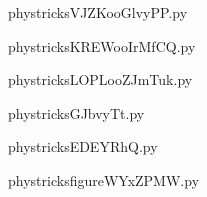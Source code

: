     \newcommand{\CaptionFigVJZKooGlvyPP}{<+Type your caption here+>}
    \begin{center}
        
    \end{center}
    phystricksVJZKooGlvyPP.py

    

    \clearpage
    


    \newcommand{\CaptionFigKREWooIrMfCQ}{<+Type your caption here+>}
    \begin{center}
        
    \end{center}
    phystricksKREWooIrMfCQ.py

    

    \clearpage
    


    \newcommand{\CaptionFigLOPLooZJmTuk}{<+Type your caption here+>}
    \begin{center}
        
    \end{center}
    phystricksLOPLooZJmTuk.py

    

    \clearpage
    


    \newcommand{\CaptionFigGJbvyTt}{<+Type your caption here+>}
    \begin{center}
        
    \end{center}
    phystricksGJbvyTt.py

    

    \clearpage
    


    \newcommand{\CaptionFigEDEYRhQ}{<+Type your caption here+>}
    \begin{center}
        
    \end{center}
    phystricksEDEYRhQ.py

    

    \clearpage
    


    \newcommand{\CaptionFigfigureWYxZPMW}{<+Type your caption here+>}
    \begin{center}
        
    \end{center}
    phystricksfigureWYxZPMW.py

